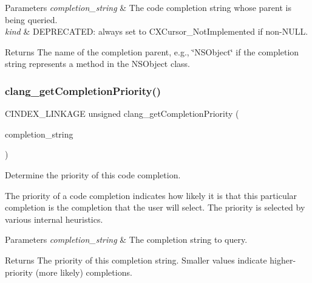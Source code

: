 \begin{DoxyParams}{Parameters}
{\em completion\+\_\+string} & The code completion string whose parent is being queried.\\
\hline
{\em kind} & D\+E\+P\+R\+E\+C\+A\+T\+ED\+: always set to C\+X\+Cursor\+\_\+\+Not\+Implemented if non-\/\+N\+U\+LL.\\
\hline
\end{DoxyParams}
\begin{DoxyReturn}{Returns}
The name of the completion parent, e.\+g., \char`\"{}\+N\+S\+Object\char`\"{} if the completion string represents a method in the N\+S\+Object class. 
\end{DoxyReturn}
\mbox{\label{group__CINDEX__CODE__COMPLET_ga46e843acdf63d9a7a0c7341a2d222c49}} 
\subsubsection{\texorpdfstring{clang\+\_\+get\+Completion\+Priority()}{clang\_getCompletionPriority()}}
{\footnotesize\ttfamily C\+I\+N\+D\+E\+X\+\_\+\+L\+I\+N\+K\+A\+GE unsigned clang\+\_\+get\+Completion\+Priority (\begin{DoxyParamCaption}\item[{\mbox{\hyperlink{group__CINDEX__CODE__COMPLET_gafea23a43a60ec3b4f3bedccfbb76883a}{C\+X\+Completion\+String}}}]{completion\+\_\+string }\end{DoxyParamCaption})}



Determine the priority of this code completion. 

The priority of a code completion indicates how likely it is that this particular completion is the completion that the user will select. The priority is selected by various internal heuristics.


\begin{DoxyParams}{Parameters}
{\em completion\+\_\+string} & The completion string to query.\\
\hline
\end{DoxyParams}
\begin{DoxyReturn}{Returns}
The priority of this completion string. Smaller values indicate higher-\/priority (more likely) completions. 
\end{DoxyReturn}
\mbox{\label{group__CINDEX__CODE__COMPLET_ga403bcb1ebc70f1ec9e19543d76685f43}} 
